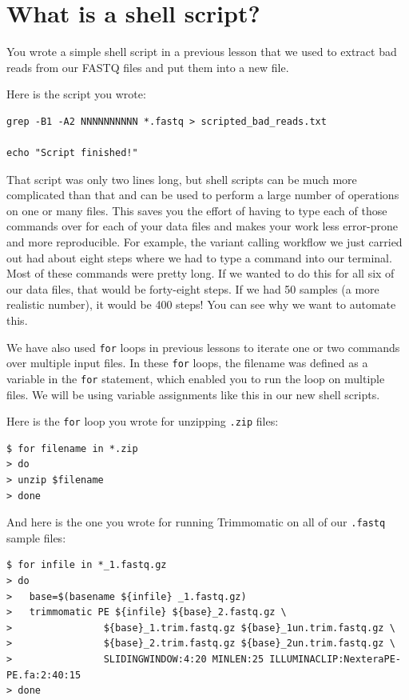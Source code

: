 \documentclass[
  letterpaper,
  DIV=11,
  numbers=noendperiod]{scrreprt}
\begin{document}
\hypertarget{what-is-a-shell-script}{%
\section{What is a shell script?}\label{what-is-a-shell-script}}

You wrote a simple shell script in a previous lesson that we used to
extract bad reads from our FASTQ files and put them into a new file.

Here is the script you wrote:

\begin{verbatim}
grep -B1 -A2 NNNNNNNNNN *.fastq > scripted_bad_reads.txt

echo "Script finished!"
\end{verbatim}

That script was only two lines long, but shell scripts can be much more
complicated than that and can be used to perform a large number of
operations on one or many files. This saves you the effort of having to
type each of those commands over for each of your data files and makes
your work less error-prone and more reproducible. For example, the
variant calling workflow we just carried out had about eight steps where
we had to type a command into our terminal. Most of these commands were
pretty long. If we wanted to do this for all six of our data files, that
would be forty-eight steps. If we had 50 samples (a more realistic
number), it would be 400 steps! You can see why we want to automate
this.

We have also used \texttt{for} loops in previous lessons to iterate one
or two commands over multiple input files. In these \texttt{for} loops,
the filename was defined as a variable in the \texttt{for} statement,
which enabled you to run the loop on multiple files. We will be using
variable assignments like this in our new shell scripts.

Here is the \texttt{for} loop you wrote for unzipping \texttt{.zip}
files:

\begin{verbatim}
$ for filename in *.zip
> do
> unzip $filename
> done
\end{verbatim}

And here is the one you wrote for running Trimmomatic on all of our
\texttt{.fastq} sample files:

\begin{verbatim}
$ for infile in *_1.fastq.gz
> do
>   base=$(basename ${infile} _1.fastq.gz)
>   trimmomatic PE ${infile} ${base}_2.fastq.gz \
>                ${base}_1.trim.fastq.gz ${base}_1un.trim.fastq.gz \
>                ${base}_2.trim.fastq.gz ${base}_2un.trim.fastq.gz \
>                SLIDINGWINDOW:4:20 MINLEN:25 ILLUMINACLIP:NexteraPE-PE.fa:2:40:15 
> done
\end{verbatim}
\end{document}
